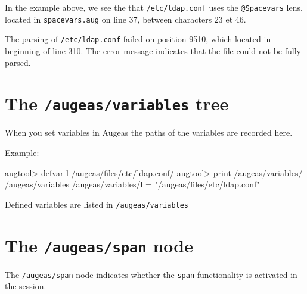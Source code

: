 In the example above, we see the that \nolinkurl{/etc/ldap.conf} uses the \verb!@Spacevars! lens, located in \verb!spacevars.aug! on line 37, between characters 23 et 46.

The parsing of \nolinkurl{/etc/ldap.conf} failed on position 9510, which located in beginning of line 310. The error message indicates that the file could not be fully parsed.


\section{The \texttt{/augeas/variables} tree}

 

When you set variables in Augeas the paths of the variables are recorded here.

 

Example:

\begin{listing}
  \begin{augtoolsh}[]
augtool> defvar l /augeas/files/etc/ldap.conf/
augtool> print /augeas/variables/
/augeas/variables
/augeas/variables/l = "/augeas/files/etc/ldap.conf"
  \end{augtoolsh}
  \caption{Defined variables are listed in \nolinkurl{/augeas/variables}}
  \label{lst:metadata_defvar}
\end{listing}

\begin{quote}

\end{quote}
\section{The \texttt{/augeas/span} node}

\label{sec:span_node}   

The \nolinkurl{/augeas/span} node indicates whether the \verb!span! functionality is activated in the session.


